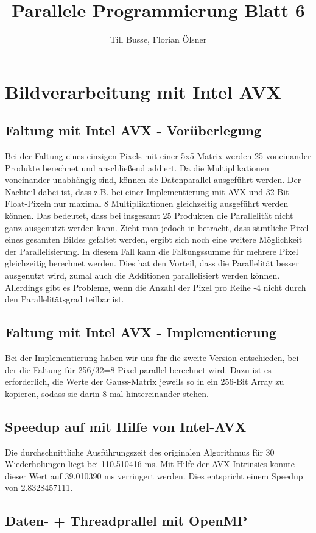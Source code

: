\documentclass[12pt,a4paper]{article}
\author{Till Busse, Florian Ölsner}
\title{Parallele Programmierung Blatt 6}
\begin{document}
\maketitle
\pagebreak
\section{Bildverarbeitung mit Intel AVX}
\subsection{Faltung mit Intel AVX - Vorüberlegung}
Bei der Faltung eines einzigen Pixels mit einer 5x5-Matrix werden 25 voneinander Produkte berechnet und anschließend addiert. Da die Multiplikationen voneinander unabhängig sind, können sie Datenparallel ausgeführt werden. Der Nachteil dabei ist, dass z.B. bei einer Implementierung mit AVX und 32-Bit-Float-Pixeln nur maximal 8 Multiplikationen gleichzeitig ausgeführt werden können. Das bedeutet, dass bei insgesamt 25 Produkten die Parallelität nicht ganz ausgenutzt werden kann. Zieht man jedoch in betracht, dass sämtliche Pixel eines gesamten Bildes gefaltet werden, ergibt sich noch eine weitere Möglichkeit der Parallelisierung. In diesem Fall kann die Faltungssumme für mehrere Pixel gleichzeitig berechnet werden. Dies hat den Vorteil, dass die Parallelität besser ausgenutzt wird, zumal auch die Additionen parallelisiert werden können. Allerdings gibt es Probleme, wenn die Anzahl der Pixel pro Reihe -4 nicht durch den Parallelitätsgrad teilbar ist.
\subsection{Faltung mit Intel AVX - Implementierung}
Bei der Implementierung haben wir uns für die zweite Version entschieden, bei der die Faltung für 256/32=8 Pixel parallel berechnet wird. Dazu ist es erforderlich, die Werte der Gauss-Matrix jeweils so in ein 256-Bit Array zu kopieren, sodass sie darin 8 mal hintereinander stehen.

\subsection{Speedup auf mit Hilfe von Intel-AVX}
Die durchschnittliche Ausführungszeit des originalen Algorithmus für 30 Wiederholungen liegt bei 110.510416 ms. Mit Hilfe der AVX-Intrinsics konnte dieser Wert auf 39.010390 ms verringert werden. Dies entspricht einem Speedup von 2.8328457111.
\subsection{Daten- + Threadprallel mit OpenMP}

\end{document}
